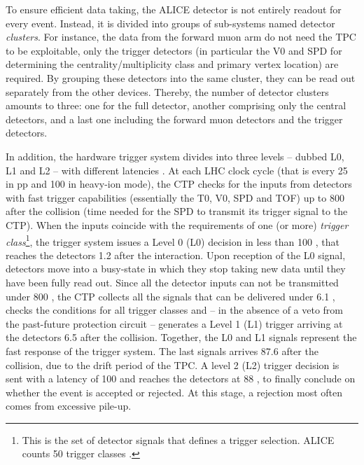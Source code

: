 To ensure efficient data taking, the ALICE detector is not entirely readout for every event. Instead, it is divided into groups of sub-systems named detector \textit{clusters}. For instance, the data from the forward muon arm do not need the TPC to be exploitable, only the trigger detectors (in particular the V0 and SPD for determining the centrality/multiplicity class and primary vertex location) are required. By grouping these detectors into the same cluster, they can be read out separately from the other devices. Thereby, the number of detector clusters amounts to three: one for the full detector, another comprising only the central detectors, and a last one including the forward muon detectors and the trigger detectors.

In addition, the hardware trigger system divides into three levels -- dubbed L0, L1 and L2 -- with different latencies \cite{bloodworthALICECentralTrigger2000}\cite{alicecollaborationTriggerDataAcquisition}. At each LHC clock cycle (that is every 25 \nsec in pp and 100 \nsec in heavy-ion mode), the CTP checks for the inputs from detectors with fast trigger capabilities (essentially the T0, V0, SPD and TOF) up to 800 \nsec after the collision (time needed for the SPD to transmit its trigger signal to the CTP). When the inputs coincide with the requirements of one (or more) \textit{trigger class}\footnote{This is the set of detector signals that defines a trigger selection. ALICE counts 50 trigger classes \cite{alicecollaborationALICEExperimentCERN2008}.}, the trigger system issues a Level 0 (L0) decision in less than 100 \nsec, that reaches the detectors 1.2 \musec after the interaction. Upon reception of the L0 signal, detectors move into a busy-state in which they stop taking new data until they have been fully read out. Since all the detector inputs can not be transmitted under 800 \nsec, the CTP collects all the signals that can be delivered under 6.1 \musec, checks the conditions for all trigger classes and -- in the absence of a veto from the past-future protection circuit -- generates a Level 1 (L1) trigger arriving at the detectors 6.5 \musec after the collision. Together, the L0 and L1 signals represent the fast response of the trigger system. The last signals arrives 87.6 \musec after the collision, due to the drift period of the TPC. A level 2 (L2) trigger decision is sent with a latency of 100 \nsec and reaches the detectors at 88 \musec, to finally conclude on whether the event is accepted or rejected. At this stage, a rejection most often comes from excessive pile-up.\\


